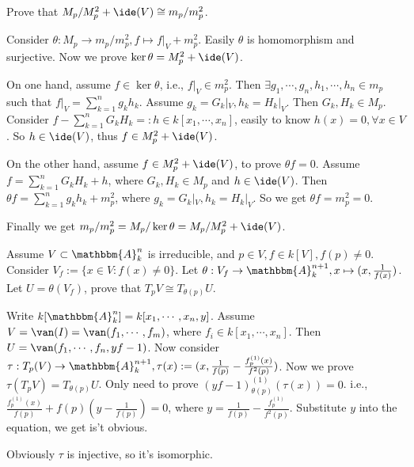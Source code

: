 \documentclass{ctexart}
\begin{document}
\begin{problem}
  Prove that \(M_p/M_p^2+\ide(V) \cong m_p/m_p^2\).
\end{problem}
\begin{solution}
  Consider \(\theta : M_p \to m_p/m_p^2, f \mapsto f|_V+m_p^2\). Easily \(\theta\) is homomorphism and surjective.
  Now we prove \(\ker \theta = M_p^2+\ide(V)\).

  On one hand, assume \(f \in \ker \theta\), i.e., \(f|_V \in m_p^2\).
  Then \(\exists g_1,\cdots,g_n,h_1,\cdots,h_n \in m_p\) such that \(f|_V=\sum_{k=1}^{n} g_k h_k\).
  Assume \(g_k=G_k|_V,h_k=H_k|_V\). Then \(G_k,H_k \in M_p\).
  Consider \(f-\sum_{k=1}^{n} G_k H_k=:h \in k[x_1,\cdots,x_n]\), easily to know \(h(x)=0,\forall x \in V\).
  So \(h \in \ide(V)\), thus \(f \in M_p^2+\ide(V)\).

  On the other hand, assume \(f \in M_p^2+\ide(V)\), to prove \(\theta f =0\).
  Assume \(f=\sum_{k=1}^{n} G_k H_k+h\), where \(G_k,H_k \in M_p\) and \(h \in \ide(V)\).
  Then \(\theta f = \sum_{k=1}^{n} g_k h_k +m_p^2\), where \(g_k=G_k|_V,h_k=H_k|_V\).
  So we get \(\theta f = m_p^2=0\).

  Finally we get \(m_p/m_p^{2} = M_p/ \ker \theta = M_p / M_p^2+\ide(V)\).
\end{solution}
\begin{problem}\label{pro:1}
  Assume \(V \subset \mathbbm{A}_k^n\) is irreducible, and \(p \in V,f \in k[V], f(p)\neq 0\).
  Consider \(V_f:= \{x \in V: f(x)\neq 0 \}\). Let \(\theta: V_f \to \mathbbm{A}_k^{n+1},x \mapsto (x,\frac{1}{f(x)})\).
  Let \(U = \theta(V_f)\), prove that \(T_p V \cong T_{\theta(p)} U\).
\end{problem}
\begin{solution}
  Write \(k[\mathbbm{A}_k^n]=k[x_1,\cdots , x_n ,y]\). Assume \(V = \van(I)= \van(f_1,\cdots, f_m)\), where \(f_i \in k[x_1,\cdots,x_n ]\).
  Then \(U = \van(f_1,\cdots,f_n, yf-1)\). Now consider \(\tau: T_p(V) \to \mathbbm{A}_k^{n+1}, \tau(x):=(x,\frac{1}{f(p)}-\frac{f_p^{(1)}(x)}{f^2(p)})\).
  Now we prove \(\tau(T_p V)=T_{\theta(p)} U\).
  Only need to prove \((yf-1)_{\theta(p)}^{(1)}(\tau(x))=0\).
  i.e., \(\frac{f_p^{(1)}(x)}{f(p)}+f(p)(y-\frac{1}{f(p)})=0\), where \(y = \frac{1}{f(p)}-\frac{f_p^{(1)}}{f^2(p)}\).
  Substitute \(y\) into the equation, we get is't obvious.

  Obviously \(\tau\) is injective, so it's isomorphic.
\end{solution}
\end{document}

